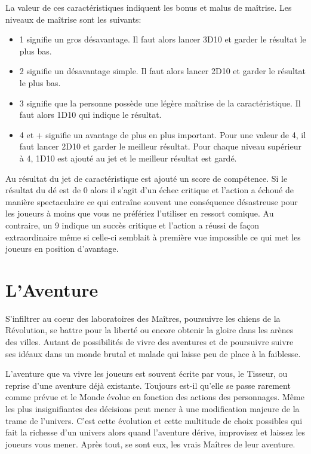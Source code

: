 La valeur de ces caractéristiques indiquent les bonus et malus de maîtrise. Les niveaux de maîtrise sont les suivants:
\begin{itemize}
    \item 1 signifie un gros désavantage. Il faut alors lancer 3D10 et garder le résultat le plus bas.
    \item 2 signifie un désavantage simple. Il faut alors lancer 2D10 et garder le résultat le plus bas.
    \item 3 signifie que la personne possède une légère maîtrise de la caractéristique. Il faut alors 1D10 qui indique le résultat.
    \item 4 et + signifie un avantage de plus en plus important. Pour une valeur de 4, il faut lancer 2D10 et garder le meilleur résultat. Pour chaque niveau supérieur à 4, 1D10 est ajouté au jet et le meilleur résultat est gardé.
\end{itemize}

Au résultat du jet de caractéristique est ajouté un score de compétence. 
Si le résultat du dé est de 0 alors il s'agit d'un échec critique et l'action a échoué de manière spectaculaire ce qui entraîne souvent une conséquence désastreuse pour les joueurs à moins que vous ne préfériez l'utiliser en ressort comique.  Au contraire, un 9 indique un succès critique et l'action a réussi de façon extraordinaire même si celle-ci semblait à première vue impossible ce qui met les joueurs en position d'avantage.

\section{L'Aventure}

S'infiltrer au coeur des laboratoires des Maîtres, poursuivre les chiens de la Révolution, se battre pour la liberté ou encore obtenir la gloire dans les arènes des villes. Autant de possibilités de vivre des aventures et de poursuivre suivre ses idéaux dans un monde brutal et malade qui laisse peu de place à la faiblesse.

L'aventure que va vivre les joueurs est souvent écrite par vous, le Tisseur, ou reprise d'une aventure déjà existante. Toujours est-il qu'elle se passe rarement comme prévue et le Monde évolue en fonction des actions des personnages. Même les plus insignifiantes des décisions peut mener à une modification majeure de la trame de l'univers. C'est cette évolution et cette multitude de choix possibles qui fait la richesse d'un univers alors quand l'aventure dérive, improvisez et laissez les joueurs vous mener. Après tout, se sont eux, les vrais Maîtres de leur aventure.

